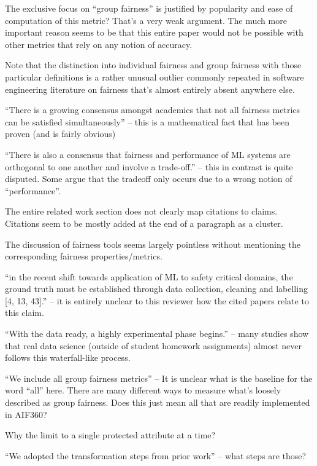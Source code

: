 \documentclass[conference,review,anonymous]{IEEEtran}
\begin{document}
\begin{IEEEitemize}
  \item The exclusive focus on ``group fairness'' is justified by popularity and ease of computation of this metric? That’s a very weak argument. The much more important reason seems to be that this entire paper would not be possible with other metrics that rely on any notion of accuracy.
  \item Note that the distinction into individual fairness and group fairness with those particular definitions is a rather unusual outlier commonly repeated in software engineering literature on fairness that’s almost entirely absent anywhere else.
  \item ``There is a growing consensus amongst academics that not all fairness metrics can be satisfied simultaneously'' -- this is a mathematical fact that has been proven (and is fairly obvious)
  \item ``There is also a consensus that fairness and performance of ML systems are orthogonal to one another and involve a trade-off.'' -- this in contrast is quite disputed. Some argue that the tradeoff only occurs due to a wrong notion of ``performance''.
  \item The entire related work section does not clearly map citations to claims. Citations seem to be mostly added at the end of a paragraph as a cluster.
  \item The discussion of fairness tools seems largely pointless without mentioning the corresponding fairness properties/metrics.
  \item ``in the recent shift towards application of ML to safety critical domains, the ground truth must be established through data collection, cleaning and labelling [4, 13, 43].'' -- it is entirely unclear to this reviewer how the cited papers relate to this claim.
  \item ``With the data ready, a highly experimental phase begins.'' -- many studies show that real data science (outside of student homework assignments) almost never follows this waterfall-like process.
  \item ``We include all group fairness metrics'' -- It is unclear what is the baseline for the word “all” here. There are many different ways to measure what’s loosely described as group fairness. Does this just mean all that are readily implemented in AIF360?
  \item Why the limit to a single protected attribute at a time?
  \item ``We adopted the transformation steps from prior work'' -- what steps are those?

\end{IEEEitemize}
\end{document}
